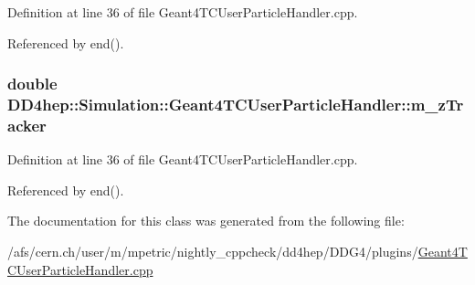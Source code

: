 Definition at line 36 of file Geant4TCUserParticleHandler.cpp.

Referenced by end().\hypertarget{class_d_d4hep_1_1_simulation_1_1_geant4_t_c_user_particle_handler_a79695432f91c1c1d7430f26e6a365a40}{
\subsubsection[{m\_\-zTracker}]{\setlength{\rightskip}{0pt plus 5cm}double {\bf DD4hep::Simulation::Geant4TCUserParticleHandler::m\_\-zTracker}}}
\label{class_d_d4hep_1_1_simulation_1_1_geant4_t_c_user_particle_handler_a79695432f91c1c1d7430f26e6a365a40}


Definition at line 36 of file Geant4TCUserParticleHandler.cpp.

Referenced by end().

The documentation for this class was generated from the following file:\begin{DoxyCompactItemize}
\item 
/afs/cern.ch/user/m/mpetric/nightly\_\-cppcheck/dd4hep/DDG4/plugins/\hyperlink{_geant4_t_c_user_particle_handler_8cpp}{Geant4TCUserParticleHandler.cpp}\end{DoxyCompactItemize}
